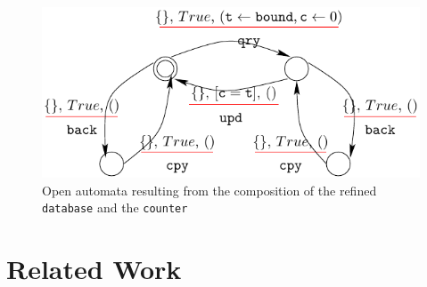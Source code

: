 \documentclass[runningheads]{llncs}
\begin{document}
\begin{figure}[h]
 \centering
   \includegraphics[width=.6\textwidth]{Figures/composeRefined.pdf}
   \caption{Open automata resulting from the composition of the  refined  \texttt{database} and the \texttt{counter} \label{Fig:ComposeRefine}}
\end{figure}






%
%
%
%

\section{Related Work}
\label{sec:sota}
\end{document}

